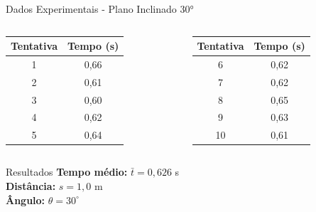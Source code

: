 \documentclass[12pt]{beamer}
\begin{document}
\begin{frame}{Dados Experimentais - Plano Inclinado 30°}
    \small
    \begin{columns}
        \begin{column}{0.5\textwidth}
            \begin{table}
                \centering
                \begin{tabular}{|c|c|}
                    \hline
                    \textbf{Tentativa} & \textbf{Tempo (s)} \\
                    \hline
                    1                  & 0,66               \\
                    2                  & 0,61               \\
                    3                  & 0,60               \\
                    4                  & 0,62               \\
                    5                  & 0,64               \\
                    \hline
                \end{tabular}
            \end{table}
        \end{column}
        \begin{column}{0.5\textwidth}
            \begin{table}
                \centering
                \begin{tabular}{|c|c|}
                    \hline
                    \textbf{Tentativa} & \textbf{Tempo (s)} \\
                    \hline
                    6                  & 0,62               \\
                    7                  & 0,62               \\
                    8                  & 0,65               \\
                    9                  & 0,63               \\
                    10                 & 0,61               \\
                    \hline
                \end{tabular}
            \end{table}
        \end{column}
    \end{columns}

    \vspace{0.3cm}
    \begin{block}{Resultados}
        \centering
        \textbf{Tempo médio:} $\bar{t} = 0,626$ s \\
        \textbf{Distância:} $s = 1,0$ m \\
        \textbf{Ângulo:} $\theta = 30^\circ$
    \end{block}
\end{frame}
\end{document}
